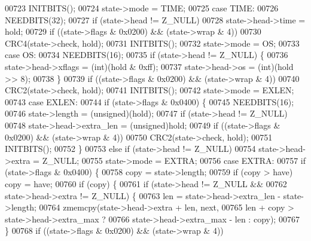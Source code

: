 \begin{DoxyCode}
{{{{00723             INITBITS();
00724             state->mode = TIME;
00725         \textcolor{keywordflow}{case} TIME:
00726             NEEDBITS(32);
00727             \textcolor{keywordflow}{if} (state->head != Z\_NULL)
00728                 state->head->time = hold;
00729             \textcolor{keywordflow}{if} ((state->flags & 0x0200) && (state->wrap & 4))
00730                 CRC4(state->check, hold);
00731             INITBITS();
00732             state->mode = OS;
00733         \textcolor{keywordflow}{case} OS:
00734             NEEDBITS(16);
00735             \textcolor{keywordflow}{if} (state->head != Z\_NULL) \{
00736                 state->head->xflags = (int)(hold & 0xff);
00737                 state->head->os = (int)(hold >> 8);
00738             \}
00739             \textcolor{keywordflow}{if} ((state->flags & 0x0200) && (state->wrap & 4))
00740                 CRC2(state->check, hold);
00741             INITBITS();
00742             state->mode = EXLEN;
00743         \textcolor{keywordflow}{case} EXLEN:
00744             \textcolor{keywordflow}{if} (state->flags & 0x0400) \{
00745                 NEEDBITS(16);
00746                 state->length = (unsigned)(hold);
00747                 \textcolor{keywordflow}{if} (state->head != Z\_NULL)
00748                     state->head->extra\_len = (unsigned)hold;
00749                 \textcolor{keywordflow}{if} ((state->flags & 0x0200) && (state->wrap & 4))
00750                     CRC2(state->check, hold);
00751                 INITBITS();
00752             \}
00753             \textcolor{keywordflow}{else} \textcolor{keywordflow}{if} (state->head != Z\_NULL)
00754                 state->head->extra = Z\_NULL;
00755             state->mode = EXTRA;
00756         \textcolor{keywordflow}{case} EXTRA:
00757             \textcolor{keywordflow}{if} (state->flags & 0x0400) \{
00758                 copy = state->length;
00759                 \textcolor{keywordflow}{if} (copy > have) copy = have;
00760                 \textcolor{keywordflow}{if} (copy) \{
00761                     \textcolor{keywordflow}{if} (state->head != Z\_NULL &&
00762                         state->head->extra != Z\_NULL) \{
00763                         len = state->head->extra\_len - state->length;
00764                         zmemcpy(state->head->extra + len, next,
00765                                 len + copy > state->head->extra\_max ?
00766                                 state->head->extra\_max - len : copy);
00767                     \}
00768                     \textcolor{keywordflow}{if} ((state->flags & 0x0200) && (state->wrap & 4))
}}}}
\end{DoxyCode}
